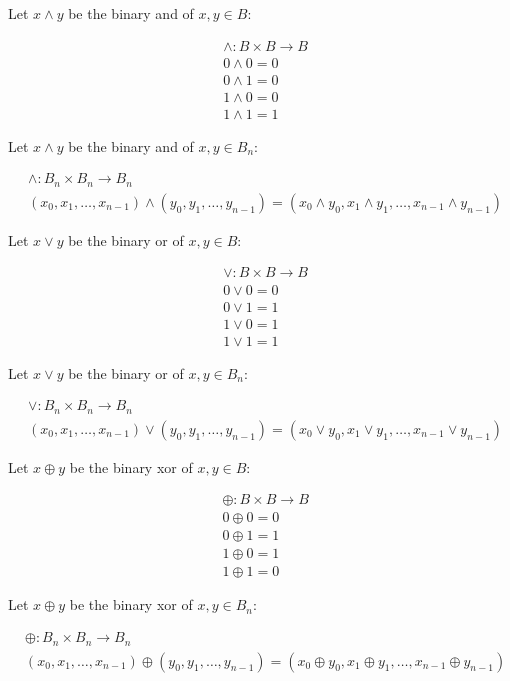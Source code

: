 \documentclass[fleqn]{article}
\begin{document}
Let $x \land y$ be the binary and of $x,y \in B$:

\begin{align*}
&\land : B \times B \to B \\
&0 \land 0 = 0 \\
&0 \land 1 = 0 \\
&1 \land 0 = 0 \\
&1 \land 1 = 1
\end{align*}

Let $x \land y$ be the binary and of $x,y \in B_n$:

\begin{align*}
&\land : B_n \times B_n \to B_n \\
&(x_0, x_1, \dots, x_{n-1}) \land (y_0, y_1, \dots, y_{n-1}) = (x_0 \land y_0, x_1 \land y_1, \dots, x_{n-1} \land y_{n-1})
\end{align*}

Let $x \lor y$ be the binary or of $x,y \in B$:

\begin{align*}
&\lor : B \times B \to B \\
&0 \lor 0 = 0 \\
&0 \lor 1 = 1 \\
&1 \lor 0 = 1 \\
&1 \lor 1 = 1
\end{align*}

Let $x \lor y$ be the binary or of $x,y \in B_n$:

\begin{align*}
&\lor : B_n \times B_n \to B_n \\
&(x_0, x_1, \dots, x_{n-1}) \lor (y_0, y_1, \dots, y_{n-1}) = (x_0 \lor y_0, x_1 \lor y_1, \dots, x_{n-1} \lor y_{n-1})
\end{align*}

Let $x \oplus y$ be the binary xor of $x,y \in B$:

\begin{align*}
&\oplus : B \times B \to B \\
&0 \oplus 0 = 0 \\
&0 \oplus 1 = 1 \\
&1 \oplus 0 = 1 \\
&1 \oplus 1 = 0
\end{align*}

Let $x \oplus y$ be the binary xor of $x,y \in B_n$:

\begin{align*}
&\oplus : B_n \times B_n \to B_n \\
&(x_0, x_1, \dots, x_{n-1}) \oplus (y_0, y_1, \dots, y_{n-1}) = (x_0 \oplus y_0, x_1 \oplus y_1, \dots, x_{n-1} \oplus y_{n-1})
\end{align*}
\end{document}

